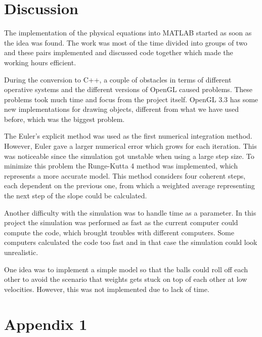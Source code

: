 \documentclass[a4paper,12pt,twoside,english]{article}
\begin{document}
\section{Discussion}
The implementation of the physical equations into MATLAB started as soon as the idea was found.
The work was most of the time divided into groups of two and these pairs implemented and discussed code together which made the working hours efficient.

During the conversion to C++, a couple of obstacles in terms of different operative systems and the different versions of OpenGL caused problems. These problems took much time and focus from the project itself. OpenGL 3.3 has some new implementations for drawing objects, different from what we have used before, which was the biggest problem.

The Euler's explicit method was used as the first numerical integration method. However, Euler gave a larger numerical error which grows for each iteration. This was noticeable since the simulation got unstable when using a large step size. To minimize this problem the Runge-Kutta 4 method was implemented, which represents a more accurate model. This method considers four coherent steps, each dependent on the previous one, from which a weighted average representing the next step of the slope could be calculated. 

Another difficulty with the simulation was to handle time as a parameter. In this project the simulation was performed as fast as the current computer could compute the code, which brought troubles with different computers. Some computers calculated the code too fast and in that case the simulation could look unrealistic.

One idea was to implement a simple model so that the balls could roll off each other to avoid the scenario that weights gets stuck on top of each other at low velocities. However, this was not implemented due to lack of time. 

\newpage



\newpage
{}
\section*{Appendix 1}
\end{document}
